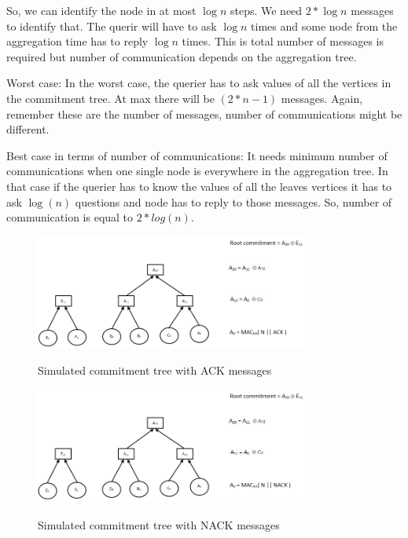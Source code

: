 So, we can identify the node in at most $\log{n}$ steps.
We need $2*\log{n}$ messages to identify that. The querir will have to 
ask $\log{n}$ times and some node from the aggregation time has to 
reply $\log{n}$ times. This is total number of messages is required but 
number of communication depends on the aggregation tree.

Worst case:
In the worst case, the querier has to ask values of all the vertices in 
the commitment tree. At max there will be $(2*n - 1)$ messages. Again, 
remember these are the number of messages, number of communications 
might be different.

Best case in terms of number of communications:
It needs minimum number of communications when one single node is
everywhere in the aggregation tree. In that case if the querier has to 
know the values of all the leaves vertices it has to ask $\log(n)$ 
questions and node has to reply to those messages. So, number of 
communication is equal to $2 *log(n)$.



\begin{figure}[t]
	\centering
		\includegraphics[width=0.8\textwidth]{ack.png}\\
		\caption{Simulated commitment tree with ACK messages}
	\label{fig:figure1}
\end{figure}

\begin{figure}[t]
	\centering
		\includegraphics[width=0.8\textwidth]{nack.png}\\
		\caption[Simulated commitment tree with NACK messages]{Simulated commitment tree with NACK messages}
	\label{fig:figure1}
\end{figure}


